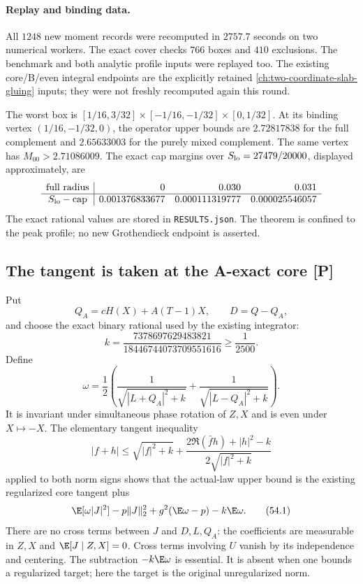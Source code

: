 \paragraph{Replay and binding data.}
All \(1248\) new moment records were recomputed in \(2757.7\) seconds
on two numerical workers. The exact cover checks \(766\) boxes
and \(410\) exclusions. The benchmark and both analytic profile
inputs were replayed too. The existing core/B/even integral
endpoints are the explicitly retained \autoref{ch:two-coordinate-slab-gluing} inputs; they
were not freshly recomputed again this round.

The worst box is
\([1/16,3/32]\times[-1/16,-1/32]\times[0,1/32]\).
At its binding vertex \((1/16,-1/32,0)\), the operator upper bounds
are \(2.72817838\) for the full complement and \(2.65633003\)
for the purely mixed complement. The same vertex has
\(M_{00}>2.71086009\).
The exact cap margins over \(S_{\rm lo}=27479/20000\),
displayed approximately, are
\[
\begin{array}{c|rrr}
\text{full radius}&0&0.030&0.031\\ \hline
S_{\rm lo}-\text{cap}&
0.001376833677&0.000111319777&0.000025546057
\end{array}
\]
The exact rational values are stored in \texttt{RESULTS.json}.
The theorem is confined to the peak profile; no new Grothendieck
endpoint is asserted.


\subsection{The tangent is taken at the A-exact core [P]}
Put
\[
 Q_A=cH(X)+A(T-1)X,\qquad D=Q-Q_A,
\]
and choose the exact binary rational used by the existing integrator:
\[
 k=\frac{7378697629483821}{18446744073709551616}
       \ge\frac1{2500}.
\]
Define
\[
 \omega=\frac12\left(
 \frac1{\sqrt{|L+Q_A|^2+k}}+
 \frac1{\sqrt{|L-Q_A|^2+k}}\right).
\]
It is invariant under simultaneous phase rotation of \(Z,X\)
and is even under \(X\mapsto-X\).
The elementary tangent inequality
\[
 |f+h|\le\sqrt{|f|^2+k}
 +\frac{2\Re(\bar f h)+|h|^2-k}{2\sqrt{|f|^2+k}}
\]
applied to both norm signs shows that the actual-law upper bound is
the existing regularized core tangent plus
\[
 \E[\omega|J|^2]-p\|J\|_2^2
       +g^2(\E\omega-p)-k\E\omega.
 \tag{54.1}
\]
There are no cross terms between \(J\) and \(D,L,Q_A\):
the coefficients are measurable in \(Z,X\) and
\(\E[J\mid Z,X]=0\).
Cross terms involving \(U\) vanish by its independence and centering.
The subtraction \(-k\E\omega\) is essential.
It is absent when one bounds a regularized target; here the target is
the original unregularized norm.

